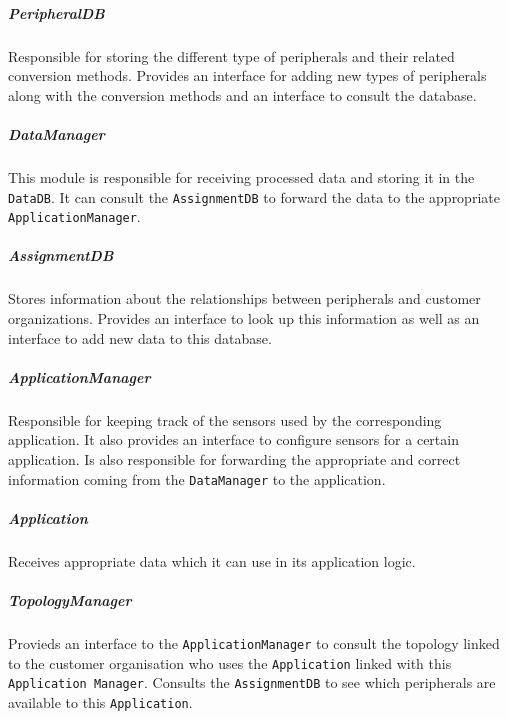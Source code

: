 \documentclass[english]{sareport}
\begin{document}
\subparagraph{PeripheralDB}
Responsible for storing the different type of peripherals and their related conversion methods. Provides an interface for adding new types of peripherals along with the conversion methods and an interface to consult the database.

\subparagraph{DataManager}
This module is responsible for receiving processed data and storing it in the \texttt{DataDB}. It can consult the \texttt{AssignmentDB} to forward the data to the appropriate \texttt{ApplicationManager}.

\subparagraph{AssignmentDB}
Stores information about the relationships between peripherals and customer organizations. Provides an interface to look up this information as well as an interface to add new data to this database.

\subparagraph{ApplicationManager}
Responsible for keeping track of the sensors used by the corresponding application. It also provides an interface to configure sensors for a certain application. Is also responsible for forwarding the appropriate and correct information coming from the \texttt{DataManager} to the application.

\subparagraph{Application}
Receives appropriate data which it can use in its application logic.

\subparagraph{TopologyManager}
Provieds an interface to the \texttt{ApplicationManager} to consult the topology linked to the customer organisation who uses the \texttt{Application} linked with this \texttt{Application Manager}. Consults the \texttt{AssignmentDB} to see which peripherals are available to this \texttt{Application}.
\end{document}
